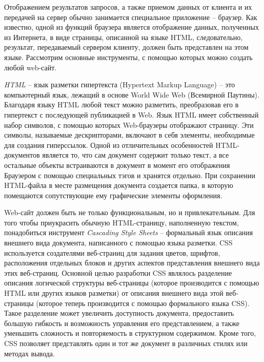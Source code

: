 
Отображением результатов запросов, а также приемом данных от клиента и их передачей на сервер обычно занимается специальное приложение -- браузер. Как известно, одной из функций браузера является отображение данных, полученных из Интернета, в виде страницы, описанной на языке HTML, следовательно, результат, передаваемый сервером клиенту, должен быть представлен на этом языке.
Рассмотрим основные инструменты, с помощью которых можно создать любой web-сайт.

{\itshape HTML } --  язык разметки гипертекста (Hypertext Markup Language)  -- это компьютерный язык, лежащий в основе World Wide Web (Всемирной Паутины). Благодаря языку HTML любой текст можно разметить, преобразовав его в гипертекст с последующей публикацией в Web.
Язык HTML имеет собственный набор символов, с помощью которых Web-браузеры отображают страницу. Эти символы, называемые дескрипторами, включают в себя элементы, необходимые для создания гиперссылок.
Одной из отличительных особенностей HTML-документов является то, что сам документ содержит только текст, а все остальные объекты встраиваются в документ в момент его отображения Браузером с помощью специальных тэгов и хранятся отдельно. При сохранении HTML-файла в месте размещения документа создается папка, в которую помещаются сопутствующие ему графические элементы оформления\cite{php}.

Web-сайт должен быть не только функциональным, но и привлекательным. Для того чтобы приукрасить обычную HTML-страницу, наполненную текстом, понадобиться инструмент {\itshape Cascading Style Sheets } -- формальный язык описания внешнего вида документа, написанного с помощью языка разметки.  CSS используется создателями веб-страниц для задания цветов, шрифтов, расположения отдельных блоков и других аспектов представления внешнего вида этих веб-страниц. Основной целью разработки CSS являлось разделение описания логической структуры веб-страницы (которое производится с помощью HTML или других языков разметки) от описания внешнего вида этой веб-страницы (которое теперь производится с помощью формального языка CSS). Такое разделение может увеличить доступность документа, предоставить большую гибкость и возможность управления его представлением, а также уменьшить сложность и повторяемость в структурном содержимом. Кроме того, CSS позволяет представлять один и тот же документ в различных стилях или методах вывода\cite{php}.

